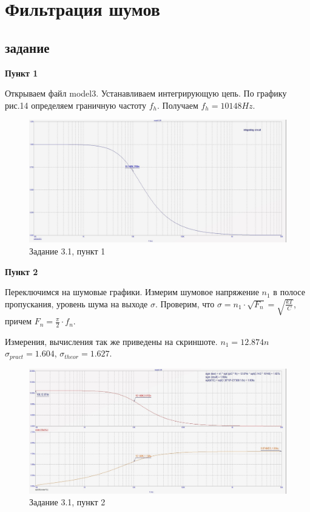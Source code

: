 \documentclass[a4paper, 14pt]{extarticle}%
\begin{document}
\newpage

\section{Фильтрация шумов}
\subsection{задание}
\textbf{Пункт 1}
\newline

Открываем файл model3. 
Устанавливаем интегрирующую цепь.
По графику рис.14 определяем граничную частоту $f_h$.
Получаем $f_h = 10148 Hz$.


\begin{figure}[h!]
			\centering
			\includegraphics[width=1.1\linewidth]{3/3_1_1.jpg}
			\caption{Задание 3.1, пункт 1}
			\label{A}
\end{figure}

\textbf{Пункт 2}
\newline

Переключимся на шумовые графики. Измерим шумовое напряжение $n_1$ в полосе пропускания, уровень шума на выходе $\sigma$. 
\newline
Проверим, что $\sigma = n_1\cdot \sqrt{F_n} = \sqrt{\frac{kT}{C}}$, причем $F_n = \frac{\pi}{2} \cdot f_n$.

Измерения, вычисления так же приведены на скриншоте.
\newline
$n_1 = 12.874n$
\newline
$\sigma_{pract} = 1.604$, $\sigma_{theor} = 1.627$.


\begin{figure}[h!]
			\centering
			\includegraphics[width=1.1\linewidth]{3/3_1_2.jpg}
			\caption{Задание 3.1, пункт 2}
			\label{A}
\end{figure}
\end{document}
